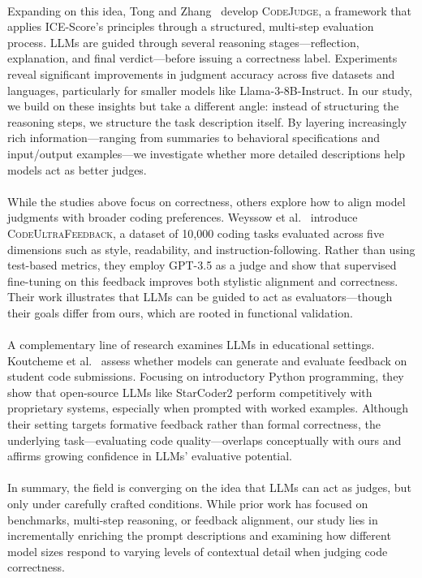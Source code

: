 \documentclass[a4paper]{usiinfbachelorproject}
\begin{document}
\\[2pt]
Expanding on this idea, Tong and Zhang~\cite{tong2024codejudge} develop \textsc{CodeJudge}, a framework that applies ICE-Score’s principles through a structured, multi-step evaluation process. LLMs are guided through several reasoning stages—reflection, explanation, and final verdict—before issuing a correctness label. Experiments reveal significant improvements in judgment accuracy across five datasets and languages, particularly for smaller models like Llama-3-8B-Instruct. In our study, we build on these insights but take a different angle: instead of structuring the reasoning steps, we structure the task description itself. By layering increasingly rich information—ranging from summaries to behavioral specifications and input/output examples—we investigate whether more detailed descriptions help models act as better judges.\\
\\[2pt]
While the studies above focus on correctness, others explore how to align model judgments with broader coding preferences. Weyssow et al.~\cite{weyssow2024codeultrafeedback} introduce \textsc{CodeUltraFeedback}, a dataset of 10,000 coding tasks evaluated across five dimensions such as style, readability, and instruction-following. Rather than using test-based metrics, they employ GPT-3.5 as a judge and show that supervised fine-tuning on this feedback improves both stylistic alignment and correctness. Their work illustrates that LLMs can be guided to act as evaluators—though their goals differ from ours, which are rooted in functional validation.\\
\\[2pt]
A complementary line of research examines LLMs in educational settings. Koutcheme et al.~\cite{koutcheme2025evaluating} assess whether models can generate and evaluate feedback on student code submissions. Focusing on introductory Python programming, they show that open-source LLMs like StarCoder2 perform competitively with proprietary systems, especially when prompted with worked examples. Although their setting targets formative feedback rather than formal correctness, the underlying task—evaluating code quality—overlaps conceptually with ours and affirms growing confidence in LLMs' evaluative potential.\\
\\[2pt]
In summary, the field is converging on the idea that LLMs can act as judges, but only under carefully crafted conditions. While prior work has focused on benchmarks, multi-step reasoning, or feedback alignment, our study lies in incrementally enriching the prompt descriptions and examining how different model sizes respond to varying levels of contextual detail when judging code correctness.
\end{document}
